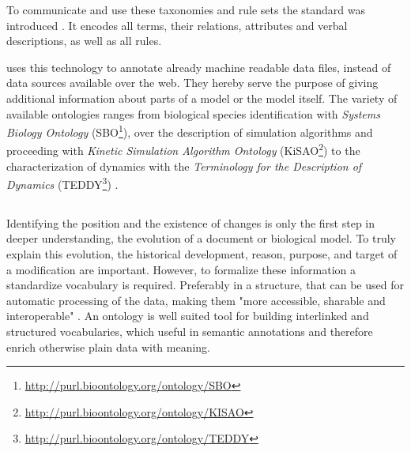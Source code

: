 	To communicate and use these taxonomies and rule sets the \owl standard was introduced \citep{Bechhofer2004,Bechhofer2009}. It encodes all terms, their relations, attributes and verbal descriptions, as well as all rules.
	
	\sysbio uses this technology to annotate already machine readable data files, instead of data sources available over the web. They hereby serve the purpose of giving additional information about parts of a model or the model itself. The variety of available ontologies ranges from biological species identification with \emph{Systems Biology Ontology} (SBO\footnote{\url{http://purl.bioontology.org/ontology/SBO}}), over the description of simulation algorithms and proceeding with \emph{Kinetic Simulation Algorithm Ontology} (KiSAO\footnote{\url{http://purl.bioontology.org/ontology/KISAO}}) to the characterization of dynamics with the \emph{Terminology for the Description of Dynamics} (TEDDY\footnote{\url{http://purl.bioontology.org/ontology/TEDDY}}) \citep{Courtot2011}.
	
	\begin{comment}
	
	\begin{itemize}
	\item definition
		\subitem formal definition, properties and relation of entities
	\item use of BioOntologies cf. Courtot \citep{Courtot2011}
	\end{itemize}

	\todo{citep owl standard, when explaining comodi import}
	\todo{http://msb.embopress.org/content/7/1/543.short for ontology overview}
	\end{comment}
	\subsection{\comodi}
	\label{sec:background:onto:comodi}
	Identifying the position and the existence of changes is only the first step in deeper understanding, the evolution of a document or biological model. To truly explain this evolution, the historical development, reason, purpose, and target of a modification are important. 
	However, to formalize these information a standardize vocabulary is required. Preferably in a structure, that can be used for automatic processing of the data, making them "more accessible, sharable and interoperable" \citep{Scharm2016}.
	An ontology is well suited tool for building interlinked and structured vocabularies, which useful in semantic annotations and therefore enrich otherwise plain data with meaning.
	
